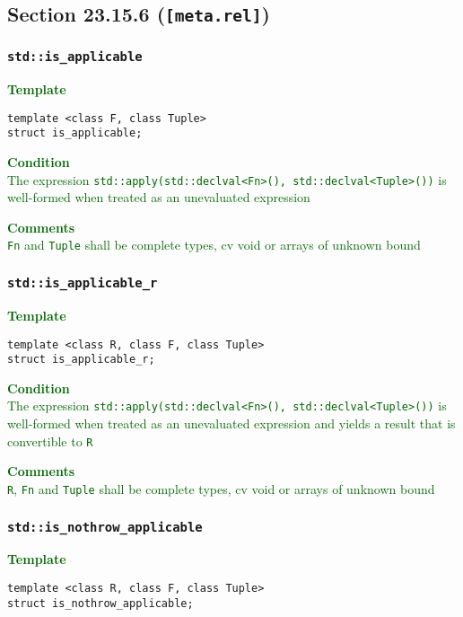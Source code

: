 \documentclass{article}
\begin{document}
\subsection{Section 23.15.6 (\texttt{[meta.rel]})}
\subsubsection{\texttt{std::is\_applicable}}
\textcolor{darkgreen}{\textbf{Template}}
\begin{lstlisting}[style=base]
template <class F, class Tuple>
struct is_applicable;
\end{lstlisting}

\textcolor{darkgreen}{\textbf{Condition}} \\
\textcolor{darkgreen}{The expression \texttt{std::apply(std::declval<Fn>(),
std::declval<Tuple>())} is well-formed when treated as an unevaluated
expression}

\textcolor{darkgreen}{\textbf{Comments}} \\
\textcolor{darkgreen}{\texttt{Fn} and \texttt{Tuple} shall be complete types,
cv void or arrays of unknown bound}

\subsubsection{\texttt{std::is\_applicable\_r}}
\textcolor{darkgreen}{\textbf{Template}}
\begin{lstlisting}[style=base]
template <class R, class F, class Tuple>
struct is_applicable_r;
\end{lstlisting}

\textcolor{darkgreen}{\textbf{Condition}} \\
\textcolor{darkgreen}{The expression \texttt{std::apply(std::declval<Fn>(),
std::declval<Tuple>())} is well-formed when treated as an unevaluated
expression and yields a result that is convertible to \texttt{R}}

\textcolor{darkgreen}{\textbf{Comments}} \\
\textcolor{darkgreen}{\texttt{R}, \texttt{Fn} and \texttt{Tuple} shall be
complete types, cv void or arrays of unknown bound}

\subsubsection{\texttt{std::is\_nothrow\_applicable}}
\textcolor{darkgreen}{\textbf{Template}}
\begin{lstlisting}[style=base]
template <class R, class F, class Tuple>
struct is_nothrow_applicable;
\end{lstlisting}
\end{document}
